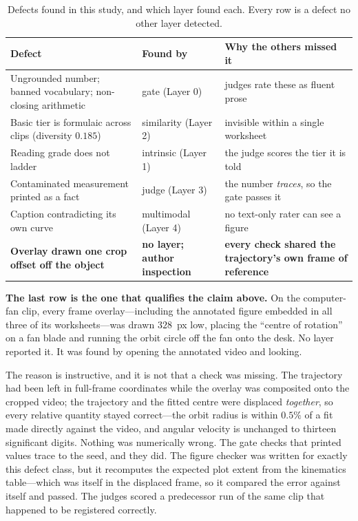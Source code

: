 \documentclass[conference]{IEEEtran}
\begin{document}
\begin{table}[t]
\caption{Defects found in this study, and which layer found each. Every row is
a defect no other layer detected.}
\label{tab:defects}
\centering
\footnotesize
\begin{tabular}{@{}p{}p{}p{}@{}}
\toprule
\textbf{Defect} & \textbf{Found by} & \textbf{Why the others missed it} \\
\midrule
Ungrounded number; banned vocabulary; non-closing arithmetic & gate (Layer 0) & judges rate these as fluent prose \\
\addlinespace[2pt]
Basic tier is formulaic across clips (diversity $0.185$) & similarity (Layer 2) & invisible within a single worksheet \\
\addlinespace[2pt]
Reading grade does not ladder & intrinsic (Layer 1) & the judge scores the tier it is told \\
\addlinespace[2pt]
Contaminated measurement printed as a fact & judge (Layer 3) & the number \emph{traces}, so the gate passes it \\
\addlinespace[2pt]
Caption contradicting its own curve & multimodal (Layer 4) & no text-only rater can see a figure \\
\addlinespace[2pt]
\textbf{Overlay drawn one crop offset off the object} & \textbf{no layer; author inspection} & \textbf{every check shared the trajectory's own frame of reference} \\
\bottomrule
\end{tabular}
\end{table}

\textbf{The last row is the one that qualifies the claim above.} On the
computer-fan clip, every frame overlay---including the annotated figure
embedded in all three of its worksheets---was drawn $328$~px low, placing the
``centre of rotation'' on a fan blade and running the orbit circle off the fan
onto the desk. No layer reported it. It was found by opening the annotated
video and looking.

The reason is instructive, and it is not that a check was missing. The
trajectory had been left in full-frame coordinates while the overlay was
composited onto the cropped video; the trajectory and the fitted centre were
displaced \emph{together}, so every relative quantity stayed correct---the
orbit radius is within $0.5\%$ of a fit made directly against the video, and
angular velocity is unchanged to thirteen significant digits. Nothing was
numerically wrong. The gate checks that printed values trace to the seed, and
they did. The figure checker was written for exactly this defect class, but it
recomputes the expected plot extent from the kinematics table---which was
itself in the displaced frame, so it compared the error against itself and
passed. The judges scored a predecessor run of the same clip that happened to
be registered correctly.
\end{document}
